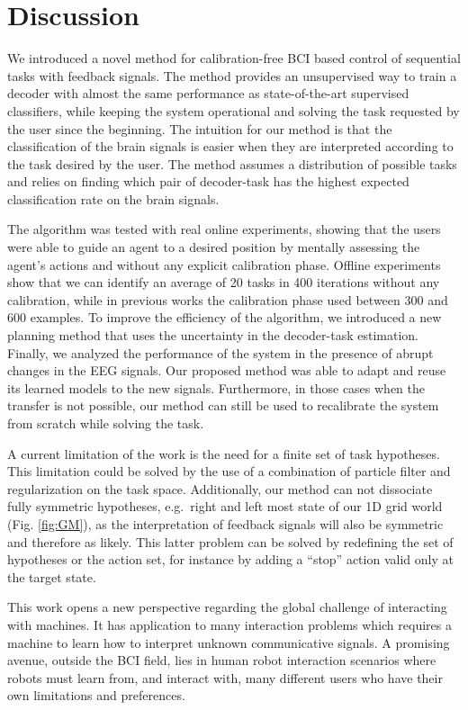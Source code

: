 \section{Discussion}

We introduced a novel method for calibration-free BCI based control of sequential tasks with feedback signals. The method provides an unsupervised way to train a decoder with almost the same performance as state-of-the-art supervised classifiers, while keeping the system operational and solving the task requested by the user since the beginning. 
%
The intuition for our method is that the classification of the brain signals is easier when they are interpreted according to the task desired by the user. The method assumes a distribution of possible tasks and relies on finding which pair of decoder-task has the highest expected classification rate on the brain signals. 


The algorithm was tested with real online experiments, showing that the users were able to guide an agent to a desired position by mentally assessing the agent's actions and without any explicit calibration phase. Offline experiments show that we can identify an average of 20 tasks in 400 iterations without any calibration, while in previous works the calibration phase used between 300 and 600 examples. To improve the efficiency of the algorithm, we introduced a new planning method that uses the uncertainty in the decoder-task estimation. Finally, we analyzed the performance of the system in the presence of abrupt changes in the EEG signals. Our proposed method was able to adapt and reuse its learned models to the new signals. Furthermore, in those cases when the transfer is not possible, our method can still be used to recalibrate the system from scratch while solving the task.

A current limitation of the work is the need for a finite set of task hypotheses. This limitation could be solved by the use of a combination of particle filter and regularization on the task space. Additionally, our method can not dissociate fully symmetric hypotheses, e.g.\ right and left most state of our 1D grid world (Fig. \ref{fig:GM}), as the interpretation of feedback signals will also be symmetric and therefore as likely. This latter problem can be solved by redefining the set of hypotheses or the action set, for instance by adding a ``stop'' action valid only at the target state.

This work opens a new perspective regarding the global challenge of interacting with machines. It has application to many interaction problems which requires a machine to learn how to interpret unknown communicative signals. A promising avenue, outside the BCI field, lies in human robot interaction scenarios where robots must learn from, and interact with, many different users who have their own limitations and preferences.




